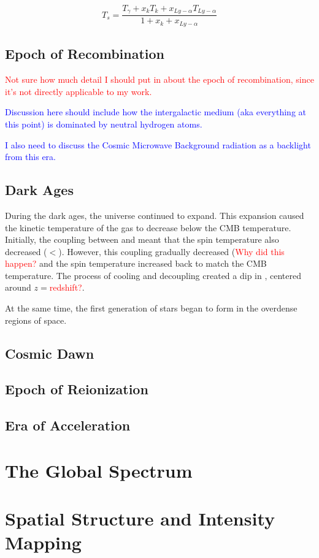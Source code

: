 \begin{equation}\label{Eq:T_s}
T_s = \frac{T_{\gamma} + x_k T_{k} + x_{Ly-\alpha} T_{Ly-\alpha}}{1+x_k +x_{Ly-\alpha}}
\end{equation}

\subsection{Epoch of Recombination}
\textcolor{red}{Not sure how much detail I should put in about the epoch of recombination, since it's not directly applicable to my work.}

\textcolor{blue}{Discussion here should include how the intergalactic medium (aka everything at this point) is dominated by neutral hydrogen atoms. }

\textcolor{blue}{I also need to discuss the Cosmic Microwave Background radiation as a backlight from this era.}

\subsection{Dark Ages}
During the dark ages, the universe continued to expand. This expansion caused the kinetic temperature of the gas to decrease below the CMB temperature. Initially, the coupling between \ts and \tk meant that the spin temperature also decreased (\ts$<$\tg). However, this coupling gradually decreased (\textcolor{red}{Why did this happen?} and the spin temperature increased back to match the CMB temperature. The process of cooling and decoupling created a dip in \ts, centered around $z=$\textcolor{red}{redshift?}. 

At the same time, the first generation of stars began to form in the overdense regions of space. 
\subsection{Cosmic Dawn}


\subsection{Epoch of Reionization}

\subsection{Era of Acceleration}

\section{The \cm Global Spectrum}

\section{\cm Spatial Structure and Intensity Mapping}

